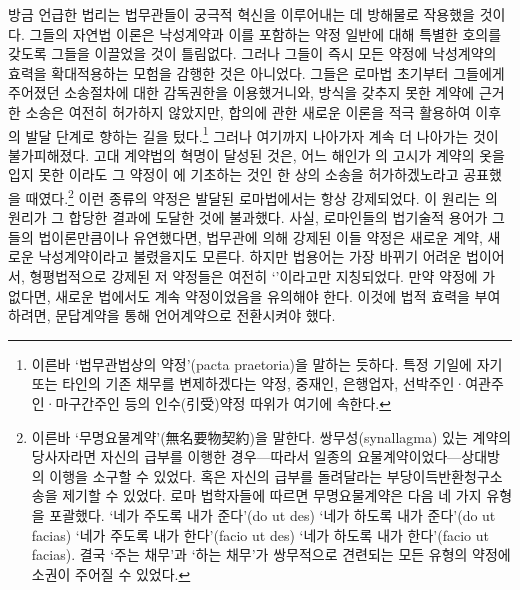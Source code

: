 방금 언급한 법리는 법무관들이 궁극적 혁신을 이루어내는 데
방해물로 작용했을 것이다.
그들의 자연법 이론은
낙성계약과 이를 포함하는 약정 일반에 대해
특별한 호의를 갖도록 그들을 이끌었을 것이 틀림없다.
그러나 그들이 즉시
모든 약정에 낙성계약의 효력을 확대적용하는 모험을 감행한 것은 아니었다.
그들은 로마법 초기부터 그들에게 주어졌던
소송절차에 대한 감독권한을 이용했거니와,
방식을 갖추지 못한 계약에 근거한 소송은 여전히 허가하지 않았지만,
합의에 관한 새로운 이론을 적극 활용하여
이후의 발달 단계로 향하는 길을 텄다.\footnote{%
  이른바 `법무관법상의 약정'(pacta praetoria)을 말하는 듯하다.
  특정 기일에 자기 또는 타인의 기존 채무를 변제하겠다는 약정,
  중재인, 은행업자, 선박주인^^b7여관주인^^b7마구간주인 등의 인수(引受)약정
  따위가 여기에 속한다. }
그러나
여기까지 나아가자
계속 더 나아가는 것이 불가피해졌다.
고대 계약법의 혁명이 달성된 것은,
어느 해인가 의 고시가
계약의 옷을 입지 못한 이라도
그 약정이 에
기초하는 것인 한
상의 소송을 허가하겠노라고 공표했을 때였다.\footnote{%
  이른바 `무명요물계약'(無名要物契約)을 말한다.
  쌍무성(synallagma) 있는 계약의 당사자라면
  자신의 급부를 이행한 경우---따라서 일종의 요물계약이었다---상대방의
  이행을 소구할 수 있었다.
  혹은 자신의 급부를 돌려달라는 부당이득반환청구소송을 제기할 수 있었다.
  로마 법학자들에 따르면 무명요물계약은 다음 네 가지 유형을 포괄했다.
  `네가 주도록 내가 준다'(do ut des)
  `네가 하도록 내가 준다'(do ut facias)
  `네가 주도록 내가 한다'(facio ut des)
  `네가 하도록 내가 한다'(facio ut facias).
  결국 `주는 채무'과 `하는 채무'가 쌍무적으로 견련되는 모든 유형의 약정에
  소권이 주어질 수 있었다.
   }
이런 종류의 약정은 발달된 로마법에서는 항상 강제되었다.
이 원리는
의 원리가 그 합당한 결과에 도달한 것에 불과했다.
사실, 로마인들의 법기술적 용어가 그들의 법이론만큼이나 유연했다면,
법무관에 의해 강제된 이들 약정은
새로운 계약, 새로운 낙성계약이라고 불렸을지도 모른다.
하지만 법용어는 가장 바뀌기 어려운 법이어서,
형평법적으로 강제된 저 약정들은
여전히 `'이라고만 지칭되었다.
만약 약정에 가 없다면,
%
새로운 법에서도 계속 약정이었음을
유의해야 한다.
이것에 법적 효력을 부여하려면,
문답계약을 통해 언어계약으로 전환시켜야 했다.

